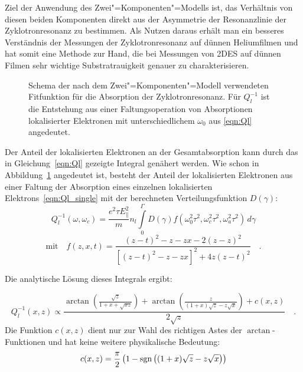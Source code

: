 Ziel der Anwendung des Zwei"=Komponenten"=Modells ist, das Verhältnis von diesen beiden Komponenten direkt aus der Asymmetrie der Resonanzlinie der Zyklotronresonanz zu bestimmen. Als Nutzen daraus erhält man ein besseres Verständnis der Messungen der Zyklotronresonanz auf dünnen Heliumfilmen und hat somit eine Methode zur Hand, die bei Messungen von 2DES auf dünnen Filmen sehr wichtige Substratrauigkeit genauer zu charakterisieren.

\begin{figure}[h!tbp]
	\hfill%
	\begin{minipage}[b]{\textwidth-\smidwidth-\tabcolsep}
		\caption[Zusammensetzung der Fitfunktion des Zwei"=Komponenten"=Modells]{Schema der nach dem Zwei"=Komponenten"=Modell verwendeten Fitfunktion für die Absorption der Zyklotronresonanz. Für $Q_l^{-1}$ ist die Entstehung aus einer Faltungsoperation von Absorptionen lokalisierter Elektronen mit unterschiedlichem $\omega_0$ aus \eqref{eqn:Ql} angedeutet.}
		\label{fig:twocomp_cr}
	\end{minipage}
\end{figure}
Der Anteil der lokalisierten Elektronen an der Gesamtabsorption kann durch das in Gleichung~\ref{eqn:Ql} gezeigte Integral genähert werden. Wie schon in Abbildung~\ref{fig:twocomp_cr} angedeutet ist, besteht der Anteil der lokalisierten Elektronen aus einer Faltung der Absorption eines einzelnen lokalisierten Elektrons~\eqref{eqn:Ql_single} mit der berechneten Verteilungsfunktion $D(\gamma)$:
    \begin{equation}
        \label{eqn:Ql}
        Q^{-1}_l(\omega, \omega_c)=\frac{e^2\tau
        E_{\parallel}^2}{m}n_l \int\limits_0^{\Gamma}
        D(\gamma) f(\omega_0^2\tau^2, \omega_c^2\tau^2, \omega_a^2\tau^2)\,d\gamma
    \end{equation}
    \begin{equation}
    		\label{eqn:Ql_single}
        \textrm{mit}\quad f(z,x,t)=\frac{(z-t)^2-z-z x-2(z-z)^2}
            {\left[(z-t)^2-z-z x\right]^2+4 z(z-t)^2}\quad.
    \end{equation}

Die analytische Lösung dieses Integrals ergibt:

	\begin{equation}
	Q^{-1}_l(x,z) \propto \frac{\arctan\left(\frac{\sqrt{z}}{1+x+\sqrt{x z}}\right)+
		\arctan\left(\frac{z}{(1+x)\sqrt{z}-z\sqrt{x}}\right)+c(x,z)}{2\sqrt{z}}\quad.
	\end{equation}
Die Funktion $c(x,z)$ dient nur zur Wahl des richtigen Astes der $\arctan$-Funktionen und hat keine weitere physikalische Bedeutung:
	\begin{equation}
		c(x,z)=\frac\pi2\left(1-\operatorname{sgn}\left((1+x)\sqrt{z}-z\sqrt{x}\right)\right)
	\end{equation}


